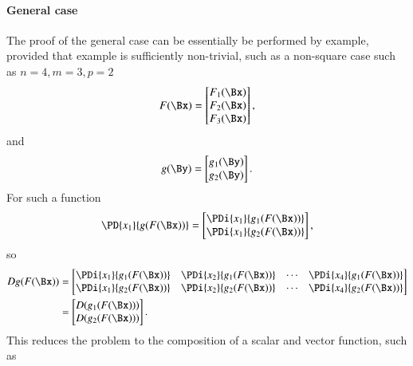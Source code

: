 \paragraph{General case}

The proof of the general case
can be essentially be performed by example, provided that example is sufficiently non-trivial, such as
a non-square case such as \( n = 4, m = 3, p = 2 \)
%
\begin{equation}\label{eqn:jacobianAndHessian:924}
F(\Bx) =
\begin{bmatrix}
F_1(\Bx) \\
F_2(\Bx) \\
F_3(\Bx) \\
\end{bmatrix},
\end{equation}
%
and
\begin{equation}\label{eqn:jacobianAndHessian:944}
g(\By)
=
\begin{bmatrix}
g_1(\By) \\
g_2(\By) \\
\end{bmatrix}.
\end{equation}
%
For such a function
%
\begin{equation}\label{eqn:jacobianAndHessian:964}
\PD{x_1}{g(F(\Bx))}
=
\begin{bmatrix}
\PDi{x_1}{g_1(F(\Bx))} \\
\PDi{x_1}{g_2(F(\Bx))}
\end{bmatrix},
\end{equation}
%
so
%
\begin{equation}\label{eqn:jacobianAndHessian:984}
\begin{aligned}
D g(F(\Bx))
&=
\begin{bmatrix}
\PDi{x_1}{g_1(F(\Bx))} & \PDi{x_2}{g_1(F(\Bx))} & \cdots & \PDi{x_4}{g_1(F(\Bx))} \\
\PDi{x_1}{g_2(F(\Bx))} & \PDi{x_2}{g_2(F(\Bx))} & \cdots & \PDi{x_4}{g_2(F(\Bx))} \\
\end{bmatrix} \\
&=
\begin{bmatrix}
D (g_1(F(\Bx))) \\
D (g_2(F(\Bx))) \\
\end{bmatrix}.
\end{aligned}
\end{equation}
%
This reduces the problem to the composition of a scalar and vector function, such as
